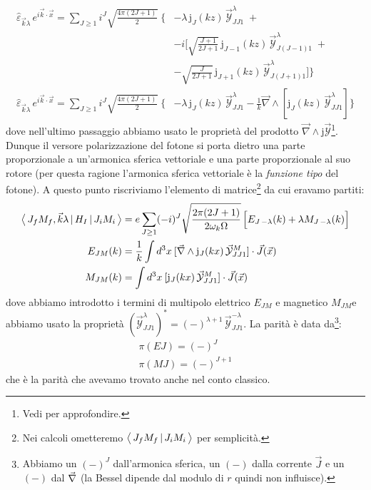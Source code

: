 \begin{displaymath}
\begin{aligned}
\widehat{\varepsilon}_{\vec{k}\lambda}\, e^{i\vec{k}\cdot\vec{x}} = \sum_{J \geq 1} i^J \sqrt{\frac{4\pi (2J+1)}{2}} \;\Biggl \{& -\lambda \,\mathrm{j}_J (kz) \, \vec{\mathcal{Y}}^\lambda_{JJ1}\; + \\
&-i\Biggl [\sqrt{\frac{J+1}{2J+1}} \,\mathrm{j}_{J-1} (kz) \, \vec{\mathcal{Y}}^\lambda_{J(J-1)1}\; + \\
& -\sqrt{\frac{J}{2J+1}} \,\mathrm{j}_{J+1} (kz) \, \vec{\mathcal{Y}}^\lambda_{J(J+1)1} \Biggr ] \Biggr \} \\
%
\widehat{\varepsilon}_{\vec{k}\lambda}\, e^{i\vec{k}\cdot\vec{x}} = \sum_{J \geq 1} i^J \sqrt{\frac{4\pi (2J+1)}{2}} \;\Biggl \{&-\lambda\,\mathrm{j}_J (kz) \, \vec{\mathcal{Y}}^\lambda_{JJ1} - \frac{1}{k} \vec{\nabla}\land [\mathrm{j}_J (kz)\, \vec{\mathcal{Y}}^\lambda_{JJ1}]\Biggr \}
\end{aligned}
\end{displaymath}
dove nell'ultimo passaggio abbiamo usato le proprietà del prodotto $\vec{\nabla}\land \mathrm{j}\vec{\mathcal{Y}}$\footnote{Vedi  per approfondire.}. Dunque il versore polarizzazione del fotone si porta dietro una parte proporzionale a un'armonica sferica vettoriale e una parte proporzionale al suo rotore (per questa ragione l'armonica sferica vettoriale è la \textit{funzione tipo} del fotone). A questo punto riscriviamo l'elemento di matrice\footnote{Nei calcoli ometteremo $\bigl\langle\, J_f M_f\, |\, J_i M_i\, \bigr\rangle$ per semplicità.} da cui eravamo partiti:
\begin{displaymath}
\begin{aligned}
\bigl\langle\, J_f M_f,\vec{k}\lambda\, |\,H_I\, |\,J_i M_i\, \bigr\rangle &= e \sum_{J\geq 1} (-i)^J \sqrt{\frac{2\pi(2J+1)}{2\omega_k\Omega}} \, \Bigl [ E_{J\,-\lambda} (k) + \lambda M_{J\,-\lambda} (k) \Bigr ] \\
E_{JM}(k) &= \frac{1}{k}\int d^3x\: [\vec{\nabla}\land \mathrm{j}_J (kx)\, \vec{\mathcal{Y}}^M_{JJ1}]\cdot \vec{J}(\vec{x}) \\
M_{JM}(k) &= \int d^3x\: [\mathrm{j}_J (kx)\, \vec{\mathcal{Y}}^M_{JJ1}]\cdot \vec{J}(\vec{x}) \\
\end{aligned}
\end{displaymath}
dove abbiamo introdotto i termini di multipolo elettrico $E_{JM}$ e magnetico $M_{JM}$e abbiamo usato la proprietà $(\vec{\mathcal{Y}}^{\lambda}_{JJ1})^* = (-)^{\lambda+1}\,\vec{\mathcal{Y}}^{-\lambda}_{JJ1}$. La parità è data da\footnote{Abbiamo un $(-)^J$ dall'armonica sferica, un $(-)$ dalla corrente $\vec{J}$ e un $(-)$ dal $\vec{\nabla}$ (la Bessel dipende dal modulo di $r$ quindi non influisce).}:
\begin{displaymath}
\begin{array}{l}
    \pi(EJ) = (-)^J \\
    \pi(MJ) = (-)^{J+1}  
\end{array}
\end{displaymath}
che è la parità che avevamo trovato anche nel conto classico.

